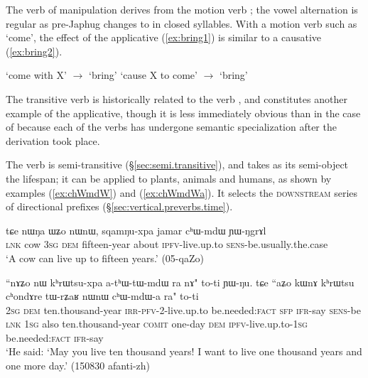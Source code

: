 The verb of manipulation  derives from the motion verb ; the vowel alternation is regular as pre-Japhug  changes to  in closed syllables. With a motion verb such as `come', the effect of the applicative (\ref{ex:bring1}) is similar to a causative  (\ref{ex:bring2}). 

\begin{exe}
\ex \label{ex:bring1}
\glt `come with X' $\rightarrow$ `bring'
\ex \label{ex:bring2}
\glt `cause X to come' $\rightarrow$ `bring'
\end{exe}

The transitive verb  is historically related to the verb , and constitutes another example of the  applicative, though it is less immediately obvious than in the case of  because each of the verbs has undergone semantic specialization after the derivation took place.

The verb  is semi-transitive (§\ref{sec:semi.transitive}), and takes as its semi-object the lifespan; it can be applied to plants, animals and humans, as shown by examples (\ref{ex:chWmdW}) and (\ref{ex:chWmdWa}). It selects the \textsc{downstream} series of directional prefixes (§\ref{sec:vertical.preverbs.time}).

 \begin{exe}
\ex \label{ex:chWmdW}
\gll tɕe nɯŋa ɯʑo nɯnɯ, sqamŋu-xpa jamar cʰɯ-mdɯ ɲɯ-ŋgrɤl\\
\textsc{lnk} cow \textsc{3sg} \textsc{dem} fifteen-year about \textsc{ipfv}-live.up.to \textsc{sens}-be.usually.the.case \\
\glt `A cow can live up to fifteen years.' (05-qaZo)
\end{exe}

 \begin{exe}
\ex \label{ex:chWmdWa}
\gll ``nɤʑo nɯ kʰrɯtsu-xpa a-tʰɯ-tɯ-mdɯ ra nɤ" to-ti ɲɯ-ŋu. tɕe ``aʑo kɯnɤ kʰrɯtsu cʰondɤre tɯ-rʑaʁ nɯnɯ cʰɯ-mdɯ-a ra" to-ti \\
\textsc{2sg} \textsc{dem} ten.thousand-year \textsc{irr}-\textsc{pfv}-2-live.up.to be.needed:\textsc{fact} \textsc{sfp} \textsc{ifr}-say \textsc{sens}-be \textsc{lnk} \textsc{1sg} also  ten.thousand-year \textsc{comit} one-day \textsc{dem} \textsc{ipfv}-live.up.to-\textsc{1sg} be.needed:\textsc{fact} \textsc{ifr}-say \\
\glt `He said: `May you live ten thousand years! I want to live one thousand years and one more day.' (150830 afanti-zh)
\end{exe}

